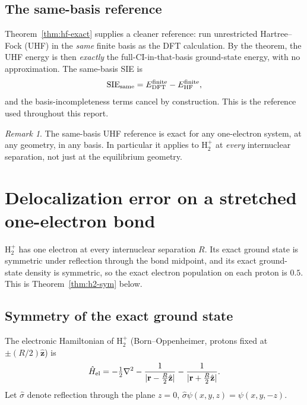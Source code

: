 \documentclass[11pt]{report}
\theoremstyle{definition}
\theoremstyle{remark}
\newtheorem{remark}{Remark}
\newcommand{\SIE}{\mathrm{SIE}}
\newcommand{\EHF}{E_{\mathrm{HF}}}
\begin{document}
\subsection{The same-basis reference}

Theorem~\ref{thm:hf-exact} supplies a cleaner reference: run unrestricted
Hartree--Fock (UHF) in the \emph{same} finite basis as the DFT calculation.
By the theorem, the UHF energy is then \emph{exactly} the
full-CI-in-that-basis ground-state energy, with no approximation. The
same-basis SIE is
\begin{equation}
\SIE_{\rm same} = E_{\rm DFT}^{\rm finite} - \EHF^{\rm finite},
\end{equation}
and the basis-incompleteness terms cancel by construction. This is the
reference used throughout this report.

\begin{remark}
The same-basis UHF reference is exact for any one-electron system, at any
geometry, in any basis. In particular it applies to H$_2^+$ at \emph{every}
internuclear separation, not just at the equilibrium geometry.
\end{remark}

\section{Delocalization error on a stretched one-electron bond}

H$_2^+$ has one electron at every internuclear separation $R$. Its exact
ground state is symmetric under reflection through the bond midpoint, and
its exact ground-state density is symmetric, so the exact electron
population on each proton is $0.5$. This is Theorem~\ref{thm:h2-sym} below.

\subsection{Symmetry of the exact ground state}

The electronic Hamiltonian of H$_2^+$ (Born--Oppenheimer, protons fixed at
$\pm (R/2) \hat{\mathbf z}$) is
\begin{equation}
\hat H_{\rm el} = -\tfrac12 \nabla^2
                  - \frac{1}{|\mathbf r - \tfrac{R}{2} \hat{\mathbf z}|}
                  - \frac{1}{|\mathbf r + \tfrac{R}{2} \hat{\mathbf z}|}.
\end{equation}
Let $\hat \sigma$ denote reflection through the plane $z = 0$,
$\hat \sigma \psi(x,y,z) = \psi(x,y,-z)$.
\end{document}
